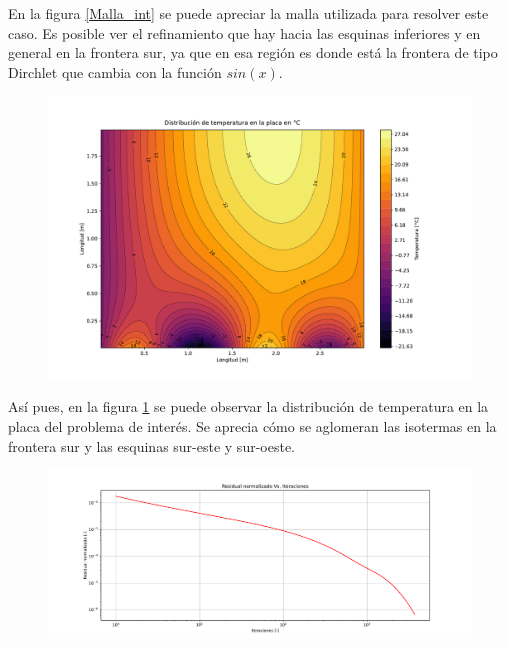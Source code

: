 \documentclass[article,latterpaper]{article}
\begin{document}
En la figura \ref{Malla_int} se puede apreciar la malla utilizada para resolver este caso. Es posible ver el refinamiento que hay hacia las esquinas inferiores y en general en la frontera sur, ya que en esa región es donde está la frontera de tipo Dirchlet que cambia con la función $sin(x)$.

\begin{figure}[H]
    \centering
    \includegraphics[scale=0.25]{Caso_interes/Dist_T.pdf}
    \caption{ }
    \label{T_int}
\end{figure}

Así pues, en la figura \ref{T_int} se puede observar la distribución de temperatura en la placa del problema de interés. Se aprecia cómo se aglomeran las isotermas en la frontera sur y las esquinas sur-este y sur-oeste.

\begin{figure}[H]
    \centering
    \includegraphics[scale=0.2]{Caso_interes/Residuales.pdf}
    \caption{ }
    \label{Res_int}
\end{figure}
\end{document}
